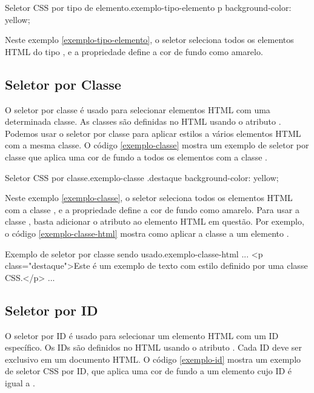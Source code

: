 \begin{csscode}{Seletor CSS por tipo de elemento.}{exemplo-tipo-elemento}
p {
    background-color: yellow;
}
\end{csscode}

Neste exemplo \ref{exemplo-tipo-elemento}, o seletor  seleciona todos os elementos HTML do tipo , e a propriedade  define a cor de fundo como amarelo.

\subsection{Seletor por Classe}

O seletor por classe é usado para selecionar elementos HTML com uma determinada classe. As classes são definidas no HTML usando o atributo . Podemos usar o seletor por classe para aplicar estilos a vários elementos HTML com a mesma classe. O código \ref{exemplo-classe} mostra um exemplo de seletor por classe que aplica uma cor de fundo a todos os elementos com a classe .

\begin{csscode}{Seletor CSS por classe.}{exemplo-classe}
.destaque {
    background-color: yellow;
}
\end{csscode}

Neste exemplo \ref{exemplo-classe}, o seletor  seleciona todos os elementos HTML com a classe , e a propriedade  define a cor de fundo como amarelo. Para usar a classe , basta adicionar o atributo  ao elemento HTML em questão. Por exemplo, o código \ref{exemplo-classe-html} mostra como aplicar a classe  a um elemento .

\begin{htmlcode}{Exemplo de seletor por classe sendo usado.}{exemplo-classe-html}
...
<p class="destaque">Este é um exemplo de texto com estilo definido por uma 
    classe CSS.</p>
...
\end{htmlcode}

\subsection{Seletor por ID}

O seletor por ID é usado para selecionar um elemento HTML com um ID específico. Os IDs são definidos no HTML usando o atributo . Cada ID deve ser exclusivo em um documento HTML. O código \ref{exemplo-id} mostra um exemplo de seletor CSS por ID, que aplica uma cor de fundo a um elemento cujo ID é igual a .

